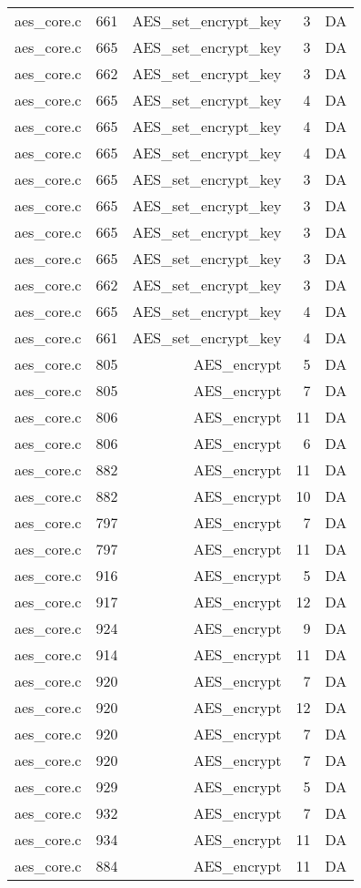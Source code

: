 \begin{table}[h]
{\begin{tabular}{clrrr}
aes\_core.c&661&AES\_set\_encrypt\_key&3 &DA\\
aes\_core.c&665&AES\_set\_encrypt\_key&3 &DA\\
aes\_core.c&662&AES\_set\_encrypt\_key&3 &DA\\
aes\_core.c&665&AES\_set\_encrypt\_key&4 &DA\\
aes\_core.c&665&AES\_set\_encrypt\_key&4 &DA\\
aes\_core.c&665&AES\_set\_encrypt\_key&4 &DA\\
aes\_core.c&665&AES\_set\_encrypt\_key&3 &DA\\
aes\_core.c&665&AES\_set\_encrypt\_key&3 &DA\\
aes\_core.c&665&AES\_set\_encrypt\_key&3 &DA\\
aes\_core.c&665&AES\_set\_encrypt\_key&3 &DA\\
aes\_core.c&662&AES\_set\_encrypt\_key&3 &DA\\
aes\_core.c&665&AES\_set\_encrypt\_key&4 &DA\\
aes\_core.c&661&AES\_set\_encrypt\_key&4 &DA\\
aes\_core.c&805&AES\_encrypt&5 &DA\\
aes\_core.c&805&AES\_encrypt&7 &DA\\
aes\_core.c&806&AES\_encrypt&11&DA\\
aes\_core.c&806&AES\_encrypt&6 &DA\\
aes\_core.c&882&AES\_encrypt&11&DA\\
aes\_core.c&882&AES\_encrypt&10&DA\\
aes\_core.c&797&AES\_encrypt&7 &DA\\
aes\_core.c&797&AES\_encrypt&11&DA\\
aes\_core.c&916&AES\_encrypt&5 &DA\\
aes\_core.c&917&AES\_encrypt&12&DA\\
aes\_core.c&924&AES\_encrypt&9 &DA\\
aes\_core.c&914&AES\_encrypt&11&DA\\
aes\_core.c&920&AES\_encrypt&7 &DA\\
aes\_core.c&920&AES\_encrypt&12&DA\\
aes\_core.c&920&AES\_encrypt&7 &DA\\
aes\_core.c&920&AES\_encrypt&7 &DA\\
aes\_core.c&929&AES\_encrypt&5 &DA\\
aes\_core.c&932&AES\_encrypt&7 &DA\\
aes\_core.c&934&AES\_encrypt&11&DA\\
aes\_core.c&884&AES\_encrypt&11&DA\\

\end{tabular}}
\end{table}
